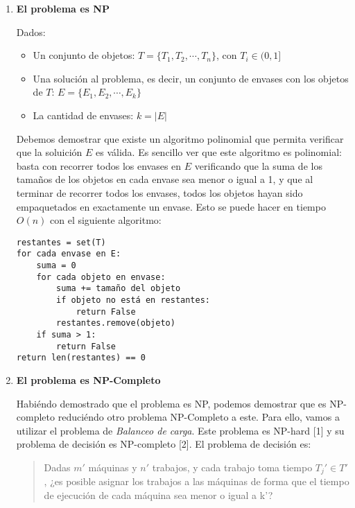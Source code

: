 \documentclass[11pt]{article}
\providecommand{\tightlist}{%
      \setlength{\itemsep}{0pt}\setlength{\parskip}{0pt}}
\begin{document}
\begin{enumerate}
\def\labelenumi{\arabic{enumi}.}
\item
  \textbf{El problema es NP}

  Dados:

  \begin{itemize}
  \tightlist
  \item
    Un conjunto de objetos: \(T = \{T_1, T_2, \dotsb , T_n\}\), con
    \(T_i \in (0, 1]\)
  \item
    Una solución al problema, es decir, un conjunto de envases con los
    objetos de \(T\): \(E = \{E_1, E_2, \dotsb, E_k\}\)
  \item
    La cantidad de envases: \(k = |E|\)
  \end{itemize}

  Debemos demostrar que existe un algoritmo polinomial que permita
  verificar que la soluición \(E\) es válida. Es sencillo ver que este
  algoritmo es polinomial: basta con recorrer todos los envases en \(E\)
  verificando que la suma de los tamaños de los objetos en cada envase
  sea menor o igual a 1, y que al terminar de recorrer todos los
  envases, todos los objetos hayan sido empaquetados en exactamente un
  envase. Esto se puede hacer en tiempo \(O(n)\) con el siguiente
  algoritmo:

\begin{verbatim}
restantes = set(T)
for cada envase en E:
    suma = 0
    for cada objeto en envase:
        suma += tamaño del objeto
        if objeto no está en restantes:
            return False
        restantes.remove(objeto)
    if suma > 1:
        return False
return len(restantes) == 0
\end{verbatim}
\item
  \textbf{El problema es NP-Completo}

  Habiéndo demostrado que el problema es NP, podemos demostrar que es
  NP-completo reduciéndo otro problema NP-Completo a este. Para ello,
  vamos a utilizar el problema de \emph{Balanceo de carga}. Este
  problema es NP-hard {[}1{]} y su problema de decisión es NP-completo
  {[}2{]}. El problema de decisión es:

  \begin{quote}
  Dadas \(m'\) máquinas y \(n'\) trabajos, y cada trabajo toma tiempo
  \(T_j' \in T'\), ¿es posible asignar los trabajos a las máquinas de
  forma que el tiempo de ejecución de cada máquina sea menor o igual a
  k'?
  \end{quote}


\end{enumerate}
\end{document}
